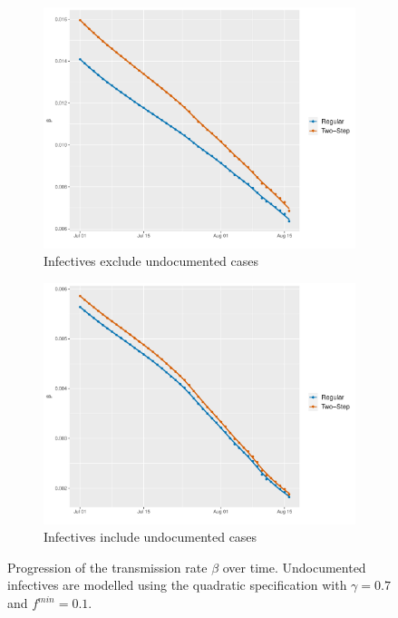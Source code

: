 \documentclass[12pt]{article}
\begin{document}
\begin{appendices}
		\begin{figure}[H]
    	    \centering
    	    \begin{subfigure}{0.495\textwidth}
    	      \centering
    	      \includegraphics[width=\linewidth]{output/panel_data_lag14_betas_rolling.pdf}
    	      \caption{Infectives exclude undocumented cases}
    	      \label{fig:beta_over_time_panel_data_rolling}
    	    \end{subfigure}
    	    \begin{subfigure}{0.495\textwidth}
    	      \centering
    	      \includegraphics[width=\linewidth]{output/panel_data_lag14_betas_UndocQuadratic_rolling.pdf}
    	      \caption{Infectives include undocumented cases}
    	      \label{fig:beta_over_time_panel_data_undoc_rolling}
    	    \end{subfigure}
    	    \caption{Progression of the transmission rate $\beta$ over time. Undocumented infectives are modelled using the quadratic specification with $\gamma = 0.7$ and $f^{min}=0.1$.}
    	    \label{fig:beta_over_time_panel_data_all}
    	\end{figure}
		

\end{appendices}
\end{document}
